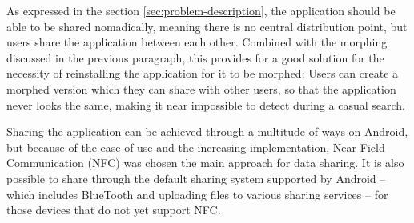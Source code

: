 As expressed in the section \ref{sec:problem-description}, the application should be able to be shared nomadically, meaning there is no central distribution point, but users share the application between each other. 
Combined with the morphing discussed in the previous paragraph, this provides for a good solution for the necessity of reinstalling the application for it to be morphed: 
Users can create a morphed version which they can share with other users, so that the application never looks the same, making it near impossible to detect during a casual search.

Sharing the application can be achieved through a multitude of ways on Android, but because of the ease of use and the increasing implementation, Near Field Communication (NFC)\cite{website:nfc-spec} was chosen the main approach for data sharing. 
It is also possible to share through the default sharing system supported by Android -- which includes BlueTooth and uploading files to various sharing services -- for those devices that do not yet support NFC.